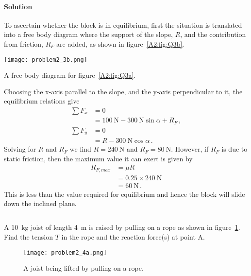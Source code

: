 \documentclass[a4paper,justified,oneside]{tufte-handout}
\numberwithin{equation}{subsection}
\begin{document}
\begin{solution}
\paragraph{Solution}
To ascertain whether the block is in equilibrium, first the situation is translated into a free body diagram where the support of the slope, $R$, and the contribution from friction, $R_F$ are added, as shown in figure~\ref{A2:fig:Q3b}.
\begin{marginfigure}
	\centering
	\texttt{[image: problem2\_3b.png]}
	\caption{A free body diagram for figure~\protect\ref{A2:fig:Q3a}.}
	\label{A2:fig:Q3b}
\end{marginfigure}
Choosing the x-axis parallel to the slope, and the y-axis perpendicular to it, the equilibrium relations give
\begin{align*}
	\sum F_x	&=	0	\\
				&= \SI{100}{\N} -\SI{300}{\N}\sin\alpha	+R_F	\,,	\\
	\sum F_y	&=	0	\\
				&=	R	-\SI{300}{\N}\cos\alpha	\,.
\end{align*}
Solving for $R$ and $R_F$ we find $R=\SI{240}{\N}$ and $R_F=\SI{80}{\N}$. However, if $R_F$ is due to static friction, then the maximum value it can exert is given by
\begin{align*}
	R_{F,max}	&=	\mu R	\\
				&=	0.25	\times \SI{240}{\N}	\\
				&=	\SI{60}{\N} \,.
\end{align*}
This is less than the value required for equilibrium and hence the block will slide down the inclined plane.
\clearpage
\end{solution}

\subsection{}
A \SI{10}{\kg} joist of length \SI{4}{\m} is raised by pulling on a rope as shown in figure~\ref{A2:fig:Q4a}. Find the tension $T$ in the rope and the reaction force(s) at point A.
\begin{figure}
	\centering
	\texttt{[image: problem2\_4a.png]}
	\caption{A joist being lifted by pulling on a rope.}
	\label{A2:fig:Q4a}
\end{figure}
\end{document}
